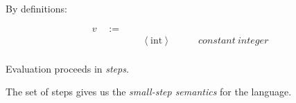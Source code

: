 \begin{frame}

  By definitions:
  
\begin{displaymath}
    \begin{aligned}
v \quad:=\quad& ~ &\\
  & ~ \left<\text{int}\right> \quad\quad &constant~integer\\
    \end{aligned}
  \end{displaymath}
\end{frame}

\begin{frame}[c]
  Evaluation proceeds in {\it steps}.
\end{frame}

\begin{frame}[c]
  The set of steps gives us the {\it small-step semantics} for the language.
\end{frame}


